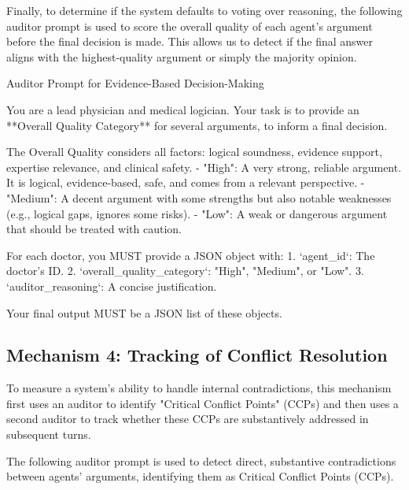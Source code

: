 \documentclass{article}
\begin{document}
Finally, to determine if the system defaults to voting over reasoning, the following auditor prompt is used to score the overall quality of each agent's argument before the final decision is made. This allows us to detect if the final answer aligns with the highest-quality argument or simply the majority opinion.

\begin{prompt}{Auditor Prompt for Evidence-Based Decision-Making}
\begin{VerbatimWrap}
You are a lead physician and medical logician. Your task is to provide an
**Overall Quality Category** for several arguments, to inform a final decision.

The Overall Quality considers all factors: logical soundness, evidence support,
expertise relevance, and clinical safety.
- "High": A very strong, reliable argument. It is logical, evidence-based, safe,
  and comes from a relevant perspective.
- "Medium": A decent argument with some strengths but also notable weaknesses
  (e.g., logical gaps, ignores some risks).
- "Low": A weak or dangerous argument that should be treated with caution.

For each doctor, you MUST provide a JSON object with:
1.  `agent_id`: The doctor's ID.
2.  `overall_quality_category`: "High", "Medium", or "Low".
3.  `auditor_reasoning`: A concise justification.

Your final output MUST be a JSON list of these objects.
\end{VerbatimWrap}
\end{prompt}

\subsection{Mechanism 4: Tracking of Conflict Resolution}
To measure a system's ability to handle internal contradictions, this mechanism first uses an auditor to identify "Critical Conflict Points" (CCPs) and then uses a second auditor to track whether these CCPs are substantively addressed in subsequent turns.

The following auditor prompt is used to detect direct, substantive contradictions between agents' arguments, identifying them as Critical Conflict Points (CCPs).
\end{document}
